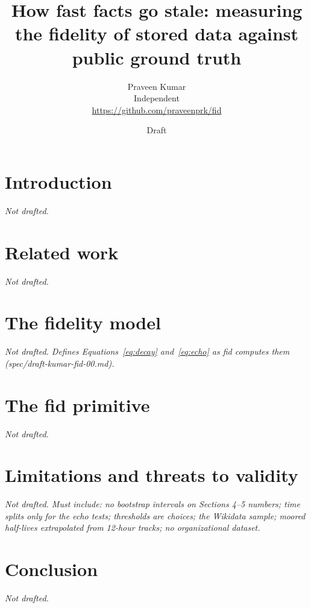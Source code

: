 \documentclass[11pt]{article}
\title{How fast facts go stale: measuring the fidelity of stored data against public ground truth}
\author{Praveen Kumar\\Independent\\\url{https://github.com/praveenprk/fid}}
\date{Draft}
\begin{document}
\maketitle

\section{Introduction}\label{sec:intro}
\emph{Not drafted.}

\section{Related work}\label{sec:related}
\emph{Not drafted.}

\section{The fidelity model}\label{sec:model}
\emph{Not drafted. Defines Equations~\eqref{eq:decay} and~\eqref{eq:echo} as
fid computes them (spec/draft-kumar-fid-00.md).}





\section{The fid primitive}\label{sec:primitive}
\emph{Not drafted.}

\section{Limitations and threats to validity}\label{sec:limitations}
\emph{Not drafted. Must include: no bootstrap intervals on Sections 4--5
numbers; time splits only for the echo tests; thresholds are choices; the
Wikidata sample; moored half-lives extrapolated from 12-hour tracks; no
organizational dataset.}

\section{Conclusion}\label{sec:conclusion}
\emph{Not drafted.}
\end{document}
